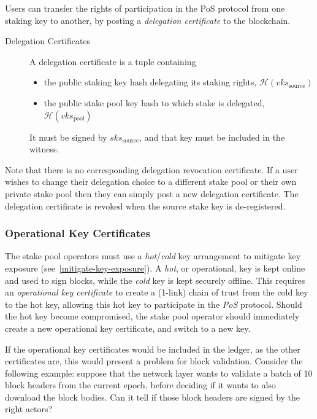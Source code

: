 \documentclass[11pt,a4paper]{article}
\begin{document}
Users can transfer the rights of participation in the PoS protocol from
one staking key to another, by posting a \emph{delegation
certificate} to the blockchain.

\begin{description}
\item[Delegation Certificates]
A delegation certificate is a tuple containing

\begin{itemize}
\item
  the public staking key hash delegating its staking rights,
  \(\mathcal{H}(vks_\text{source})\)
\item
  the public stake pool key hash to which stake is delegated,
  \(\mathcal{H}(vks_\text{pool})\)
\end{itemize}

It must be signed by \(sks_\text{source}\), and that key must be
included in the witness.
\end{description}

Note that there is no corresponding delegation revocation certificate.
If a user wishes to change their delegation choice to a different stake
pool or their own private stake pool then they can simply post a new
delegation certificate. The delegation certificate is revoked when the
source stake key is de-registered.

\subsubsection{Operational Key Certificates}
\label{operational-key-certificates}

The stake pool operators must use a \emph{hot}/\emph{cold} key
arrangement to mitigate key exposure
(see~\cref{mitigate-key-exposure}). A \emph{hot}, or operational, key
is kept online and used to sign blocks, while the \emph{cold} key is
kept securely offline. This requires an \emph{operational key
  certificate} to create a (1-link) chain of trust from the cold key
to the hot key, allowing this hot key to participate in the \emph{PoS}
protocol. Should the hot key become compromised, the stake pool
operator should immediately create a new operational key certificate, and
switch to a new key.

If the operational key certificates would be included in the ledger,
as the other certificates are, this would present a problem for block
validation. Consider the following example: suppose that the network
layer wants to validate a batch of 10 block headers from the current
epoch, before deciding if it wants to also download the block
bodies. Can it tell if those block headers are signed by the right
actors?
\end{document}
